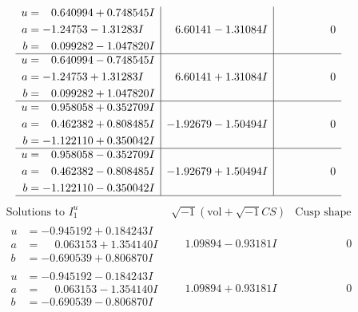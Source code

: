 \documentclass[1p]{elsarticle_modified}
\theoremstyle{definition}
\newcommand{\I}{\sqrt{-1}}
\begin{document}
$$\begin{array}{c|c|c}
\begin{aligned}
u &= \phantom{-}0.640994 + 0.748545 I \\
a &= -1.24753 - 1.31283 I \\
b &= \phantom{-}0.099282 - 1.047820 I\end{aligned}
 & \phantom{-}6.60141 - 1.31084 I & \phantom{-0.000000 } 0 \\ \hline\begin{aligned}
u &= \phantom{-}0.640994 - 0.748545 I \\
a &= -1.24753 + 1.31283 I \\
b &= \phantom{-}0.099282 + 1.047820 I\end{aligned}
 & \phantom{-}6.60141 + 1.31084 I & \phantom{-0.000000 } 0 \\ \hline\begin{aligned}
u &= \phantom{-}0.958058 + 0.352709 I \\
a &= \phantom{-}0.462382 + 0.808485 I \\
b &= -1.122110 + 0.350042 I\end{aligned}
 & -1.92679 - 1.50494 I & \phantom{-0.000000 } 0 \\ \hline\begin{aligned}
u &= \phantom{-}0.958058 - 0.352709 I \\
a &= \phantom{-}0.462382 - 0.808485 I \\
b &= -1.122110 - 0.350042 I\end{aligned}
 & -1.92679 + 1.50494 I & \phantom{-0.000000 } 0\\
 \hline 
 \end{array}$$\newpage$$\begin{array}{c|c|c}  
\text{Solutions to }I^u_{1}& \I (\text{vol} + \sqrt{-1}CS) & \text{Cusp shape}\\
 \hline 
\begin{aligned}
u &= -0.945192 + 0.184243 I \\
a &= \phantom{-}0.063153 + 1.354140 I \\
b &= -0.690539 + 0.806870 I\end{aligned}
 & \phantom{-}1.09894 - 0.93181 I & \phantom{-0.000000 } 0 \\ \hline\begin{aligned}
u &= -0.945192 - 0.184243 I \\
a &= \phantom{-}0.063153 - 1.354140 I \\
b &= -0.690539 - 0.806870 I\end{aligned}
 & \phantom{-}1.09894 + 0.93181 I & \phantom{-0.000000 } 0 \\ \hline\begin{aligned}

\end{aligned}
\end{array}$$
\end{document}

